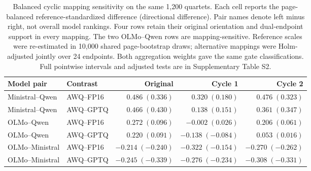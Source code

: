 \begin{table}[t]
\centering
\small
\caption{Balanced cyclic mapping sensitivity on the same 1,200 quartets. Each cell reports the page-balanced reference-standardized difference (directional difference). Pair names denote left minus right, not overall model rankings. Four rows retain their original orientation and dual-endpoint support in every mapping. The two OLMo--Qwen rows are mapping-sensitive. Reference scales were re-estimated in 10,000 shared page-bootstrap draws; alternative mappings were Holm-adjusted jointly over 24 endpoints. Both aggregation weights gave the same gate classifications. Full pointwise intervals and adjusted tests are in Supplementary Table S2.}
\label{tab:balanced-mapping}
\begin{tabular}{llrrr}
\toprule
Model pair & Contrast & Original & Cycle 1 & Cycle 2 \\
\midrule
Ministral--Qwen & AWQ--FP16 & $0.486\;(0.336)$ & $0.320\;(0.180)$ & $0.476\;(0.323)$ \\
Ministral--Qwen & AWQ--GPTQ & $0.466\;(0.430)$ & $0.138\;(0.151)$ & $0.361\;(0.347)$ \\
OLMo--Qwen & AWQ--FP16 & $0.272\;(0.096)$ & $-0.002\;(0.026)$ & $0.206\;(0.061)$ \\
OLMo--Qwen & AWQ--GPTQ & $0.220\;(0.091)$ & $-0.138\;(-0.084)$ & $0.053\;(0.016)$ \\
OLMo--Ministral & AWQ--FP16 & $-0.214\;(-0.240)$ & $-0.322\;(-0.154)$ & $-0.270\;(-0.262)$ \\
OLMo--Ministral & AWQ--GPTQ & $-0.245\;(-0.339)$ & $-0.276\;(-0.234)$ & $-0.308\;(-0.331)$ \\
\bottomrule
\end{tabular}
\end{table}

